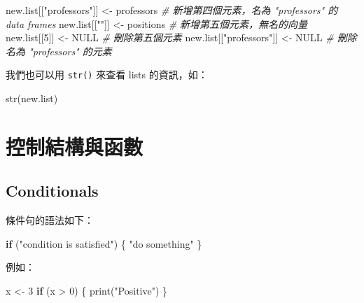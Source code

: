 \documentclass[
]{book}
\newenvironment{Shaded}{\begin{snugshade}}{\end{snugshade}}
\newcommand{\CommentTok}[1]{\textcolor[rgb]{0.56,0.35,0.01}{\textit{#1}}}
\newcommand{\ConstantTok}[1]{\textcolor[rgb]{0.00,0.00,0.00}{#1}}
\newcommand{\ControlFlowTok}[1]{\textcolor[rgb]{0.13,0.29,0.53}{\textbf{#1}}}
\newcommand{\DecValTok}[1]{\textcolor[rgb]{0.00,0.00,0.81}{#1}}
\newcommand{\FunctionTok}[1]{\textcolor[rgb]{0.00,0.00,0.00}{#1}}
\newcommand{\NormalTok}[1]{#1}
\newcommand{\OtherTok}[1]{\textcolor[rgb]{0.56,0.35,0.01}{#1}}
\newcommand{\SpecialCharTok}[1]{\textcolor[rgb]{0.00,0.00,0.00}{#1}}
\newcommand{\StringTok}[1]{\textcolor[rgb]{0.31,0.60,0.02}{#1}}
\theoremstyle{definition}
\theoremstyle{remark}
\begin{document}
\begin{Shaded}
\begin{Highlighting}[]
\NormalTok{new.list[[}\StringTok{"professors"}\NormalTok{]] }\OtherTok{\textless{}{-}}\NormalTok{ professors  }\CommentTok{\# 新增第四個元素，名為 "professors" 的 data frames}
\NormalTok{new.list[[}\StringTok{""}\NormalTok{]] }\OtherTok{\textless{}{-}}\NormalTok{ positions  }\CommentTok{\# 新增第五個元素，無名的向量}
\NormalTok{new.list[[}\DecValTok{5}\NormalTok{]] }\OtherTok{\textless{}{-}} \ConstantTok{NULL}  \CommentTok{\# 刪除第五個元素}
\NormalTok{new.list[[}\StringTok{"professors"}\NormalTok{]] }\OtherTok{\textless{}{-}} \ConstantTok{NULL}  \CommentTok{\# 刪除名為 "professors" 的元素}
\end{Highlighting}
\end{Shaded}

我們也可以用 \texttt{str()} 來查看 lists 的資訊，如：

\begin{Shaded}
\begin{Highlighting}[]
\FunctionTok{str}\NormalTok{(new.list)}
\end{Highlighting}
\end{Shaded}

\hypertarget{control}{%
\chapter{控制結構與函數}\label{control}}

\hypertarget{conditionals}{%
\section{Conditionals}\label{conditionals}}

條件句的語法如下：

\begin{Shaded}
\begin{Highlighting}[]
\ControlFlowTok{if}\NormalTok{ (}\StringTok{"condition is satisfied"}\NormalTok{) \{}
  \StringTok{"do something"}
\NormalTok{\}}
\end{Highlighting}
\end{Shaded}

例如：

\begin{Shaded}
\begin{Highlighting}[]
\NormalTok{x }\OtherTok{\textless{}{-}} \DecValTok{3}
\ControlFlowTok{if}\NormalTok{ (x }\SpecialCharTok{\textgreater{}} \DecValTok{0}\NormalTok{) \{}
  \FunctionTok{print}\NormalTok{(}\StringTok{"Positive"}\NormalTok{)}
\NormalTok{\}}
\end{Highlighting}
\end{Shaded}
\end{document}
